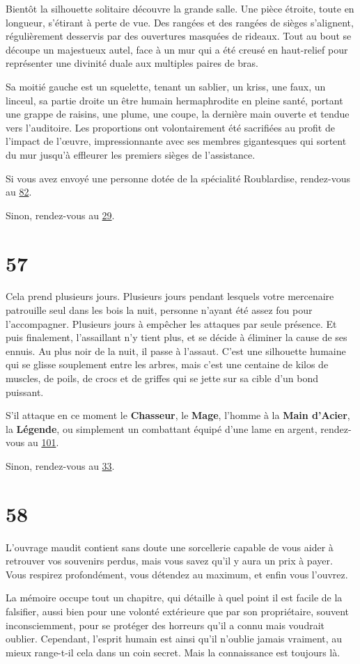 \documentclass{report}
\newcommand{\gsection}[1]{
    \section{#1}
    \label{section-#1}
}
\newcommand{\glink}[1]{\hyperref[section-#1]{#1}}
\newcommand{\hero}[1]{\textbf{#1}}
\begin{document}
Bientôt la silhouette solitaire découvre la grande salle. Une pièce étroite, toute en longueur, s'étirant à perte de vue. Des rangées et des rangées de sièges s'alignent, régulièrement desservis par des ouvertures masquées de rideaux. Tout au bout se découpe un majestueux autel, face à un mur qui a été creusé en haut-relief pour représenter une divinité duale aux multiples paires de bras.

Sa moitié gauche est un squelette, tenant un sablier, un kriss, une faux, un linceul, sa partie droite un être humain hermaphrodite en pleine santé, portant une grappe de raisins, une plume, une coupe, la dernière main ouverte et tendue vers l'auditoire. Les proportions ont volontairement été sacrifiées au profit de l'impact de l’œuvre, impressionnante avec ses membres gigantesques qui sortent du mur jusqu'à effleurer les premiers sièges de l'assistance.

Si vous avez envoyé une personne dotée de la spécialité Roublardise, rendez-vous au \glink{82}.

Sinon, rendez-vous au \glink{29}.

\gsection{57}

Cela prend plusieurs jours. Plusieurs jours pendant lesquels votre mercenaire patrouille seul dans les bois la nuit, personne n'ayant été assez fou pour l'accompagner. Plusieurs jours à empêcher les attaques par seule présence. Et puis finalement, l'assaillant n'y tient plus, et se décide à éliminer la cause de ses ennuis. Au plus noir de la nuit, il passe à l'assaut. C'est une silhouette humaine qui se glisse souplement entre les arbres, mais c'est une centaine de kilos de muscles, de poils, de crocs et de griffes qui se jette sur sa cible d'un bond puissant. 

S'il attaque en ce moment le \hero{Chasseur}, le \hero{Mage}, l'homme à la \hero{Main d'Acier}, la \hero{Légende}, ou simplement un combattant équipé d'une lame en argent, rendez-vous au \glink{101}.

Sinon, rendez-vous au \glink{33}.

\gsection{58}

L'ouvrage maudit contient sans doute une sorcellerie capable de vous aider à retrouver vos souvenirs perdus, mais vous savez qu'il y aura un prix à payer. Vous respirez profondément, vous détendez au maximum, et enfin vous l'ouvrez.

La mémoire occupe tout un chapitre, qui détaille à quel point il est facile de la falsifier, aussi bien pour une volonté extérieure que par son propriétaire, souvent inconsciemment, pour se protéger des horreurs qu'il a connu mais voudrait oublier. Cependant, l'esprit humain est ainsi qu'il n'oublie jamais vraiment, au mieux range-t-il cela dans un coin secret. Mais la connaissance est toujours là.
\end{document}
